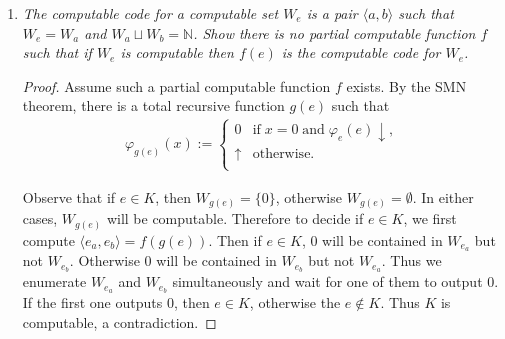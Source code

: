 \documentclass{article}
\begin{document}
\begin{enumerate}[label={\bf Q\arabic*:}]
    \begin{proof}
      Assume such a partial computable function $f$ exists. By the SMN
      theorem, there is a total recursive function $g(e)$ such that
      \begin{align*}
        \varphi_{g(e)}(s) :=
        \begin{cases}
          1, &\text{if}\; \varphi_{e}(e)\; \text{halts at step}\; s,\\
          0, &\text{otherwise}.
        \end{cases}
      \end{align*}

      Then if $e\in K$ halts, $\varphi_{g(e)}$ will be the characteristic
      function of some single element set $\{s\}$, otherwise
      $\varphi_{g(e)}$ will be the characteristic function of the empty
      set. Thus $e\in K$ if and only if $f(g(e))$ is the index
      corresponding to a finite set $\{s\}$, which contradicts the
      incomputability of $K$.
    \end{proof}

  \item \it The computable code for a computable set $W_e$ is a pair
    $\langle a,b\rangle$ such that $W_e=W_a$ and $W_a\sqcup
    W_b=\mathbb{N}$. Show there is no partial computable function $f$ such
    that if $W_e$ is computable then $f(e)$ is the computable code for
    $W_e$.

    \begin{proof}
      Assume such a partial computable function $f$ exists. By the SMN
      theorem, there is a total recursive function $g(e)$ such that
      \begin{align*}
        \varphi_{g(e)}(x) :=
        \begin{cases}
          0 &\text{if}\; x=0\; \text{and}\; \varphi_e(e)\downarrow,\\
          \uparrow &\text{otherwise}.\\
        \end{cases}
      \end{align*}

      Observe that if $e\in K$, then $W_{g(e)}=\{0\}$, otherwise
      $W_{g(e)}=\emptyset$. In either cases, $W_{g(e)}$ will be computable.
      Therefore to decide if $e\in K$, we first compute $\langle
      e_a,e_b\rangle=f(g(e))$. Then if $e\in K$, 0 will be contained in
      $W_{e_a}$ but not $W_{e_b}$. Otherwise 0 will be contained in
      $W_{e_b}$ but not $W_{e_a}$. Thus we enumerate $W_{e_a}$ and
      $W_{e_b}$ simultaneously and wait for one of them to output 0. If the
      first one outputs 0, then $e\in K$, otherwise the $e\not\in K$. Thus
      $K$ is computable, a contradiction.
    \end{proof}


\end{enumerate}
\end{document}
